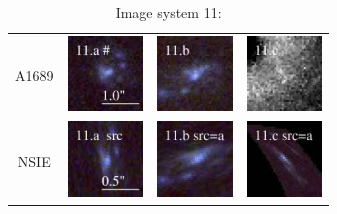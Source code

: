 \documentclass[useAMS,usenatbib]{mn2e}
\begin{document}
\begin{table}
  \caption{Image system 11:}\vspace{0mm}
  \begin{tabular}{cccc}
    \multicolumn{1}{m{1cm}}{{\Large A1689}}
    & \multicolumn{1}{m{1.7cm}}{\includegraphics[height=2.00cm,clip]{figs/nsie_img/rgb.img_11_a.ps}}
    & \multicolumn{1}{m{1.7cm}}{\includegraphics[height=2.00cm,clip]{figs/nsie_img/rgb.img_11_b.ps}}
    & \multicolumn{1}{m{1.7cm}}{\includegraphics[height=2.00cm,clip]{figs/nsie_img/eF775outac_sub.img_11_c.ps}} \\
    \multicolumn{1}{m{1cm}}{{\Large NSIE}}
    & \multicolumn{1}{m{1.7cm}}{\includegraphics[height=2.00cm,clip]{figs/nsie_img/rgb.src_11_a.ps}}
    & \multicolumn{1}{m{1.7cm}}{\includegraphics[height=2.00cm,clip]{figs/nsie_img/rgb.pre_11_b_a_tri.ps}}
    & \multicolumn{1}{m{1.7cm}}{\includegraphics[height=2.00cm,clip]{figs/nsie_img/rgb.pre_11_c_a_tri.ps}} \\

\end{tabular}
\end{table}
\end{document}
